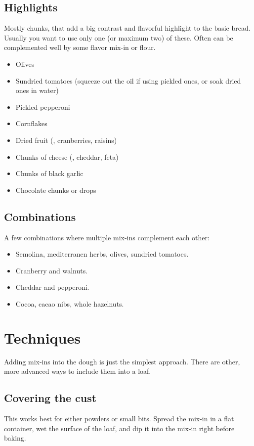 \subsection{Highlights}
Mostly chunks, that add a big contrast and flavorful highlight to the basic
bread. Usually you want to use only one (or maximum two) of these. Often can
be complemented well by some flavor mix-in or flour.
\begin{itemize}
  \item Olives
  \item Sundried tomatoes (squeeze out the oil if using pickled ones, or soak
      dried ones in water)
  \item Pickled pepperoni
  \item Cornflakes
  \item Dried fruit (\eg, cranberries, raisins)
  \item Chunks of cheese (\eg, cheddar, feta)
  \item Chunks of black garlic
  \item Chocolate chunks or drops
\end{itemize}

\subsection{Combinations}
A few combinations where multiple mix-ins complement each other:
\begin{itemize}
  \item Semolina, mediterranen herbs, olives, sundried tomatoes.
  \item Cranberry and walnuts.
  \item Cheddar and pepperoni.
  \item Cocoa, cacao nibs, whole hazelnuts.
\end{itemize}

\section{Techniques}
Adding mix-ins into the dough is just the simplest approach. There are other,
more advanced ways to include them into a loaf.

\subsection{Covering the cust}
This works best for either powders or small bits. Spread the mix-in in a flat
container, wet the surface of the loaf, and dip it into the mix-in right
before baking.


